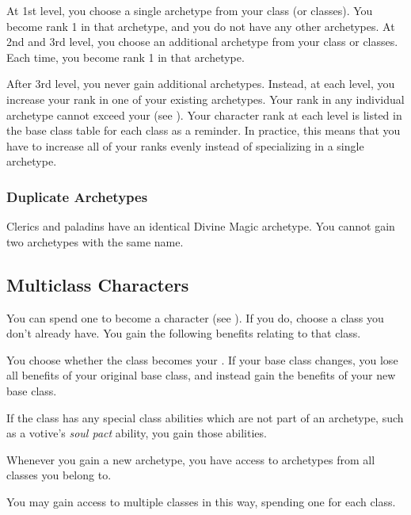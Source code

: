       At 1st level, you choose a single archetype from your class (or classes).
      You become rank 1 in that archetype, and you do not have any other archetypes.
      At 2nd and 3rd level, you choose an additional archetype from your class or classes.
      Each time, you become rank 1 in that archetype.

      After 3rd level, you never gain additional archetypes.
      Instead, at each level, you increase your rank in one of your existing archetypes.
      Your rank in any individual archetype cannot exceed your  (see ).
      Your character rank at each level is listed in the base class table for each class as a reminder.
      In practice, this means that you have to increase all of your ranks evenly instead of specializing in a single archetype.

    \subsubsection{Duplicate Archetypes}\label{Duplicate Archetypes}
      Clerics and paladins have an identical Divine Magic archetype.
      You cannot gain two archetypes with the same name.

  \subsection{Multiclass Characters}\label{Multiclass Characters}
    You can spend one  to become a  character (see ).
    If you do, choose a class you don't already have.
    You gain the following benefits relating to that class.
    \begin{raggeditemize}
      \item You choose whether the class becomes your .
        If your base class changes, you lose all benefits of your original base class, and instead gain the benefits of your new base class.
      \item If the class has any special class abilities which are not part of an archetype, such as a votive's \textit{soul pact} ability, you gain those abilities.
      \item Whenever you gain a new archetype, you have access to archetypes from all classes you belong to.
    \end{raggeditemize}

    You may gain access to multiple classes in this way, spending one  for each class.

